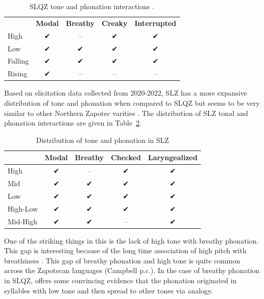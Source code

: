 \documentclass[12pt, letterpaper]{article}
\providecommand{\lsptoprule}{\midrule\toprule}
\providecommand{\lspbottomrule}{\bottomrule\midrule}
\begin{document}
\begin{table}[!ht]
	\centering
	\caption{SLQZ tone and phonation interactions \citep{chavez-peonInteractionMetricalStructure2010}.}
	\label{tab:SLQZ}
	 \begin{tabular}{lcccc}
	  \lsptoprule
					  &	 \textbf{Modal}  & \textbf{Breathy} & \textbf{Creaky} & \textbf{Interrupted} \\
		  High	& ✔︎ & -- & ✔︎ & ✔︎ \\
		  Low & ✔︎ & ✔︎ & ✔︎ & ✔︎ \\
		  Falling & ✔︎ & ✔︎ & ✔︎ & ✔︎ \\
		  Rising & ✔︎ & -- & -- & -- \\
	  \lspbottomrule
	 \end{tabular}
\end{table}

Based on elicitation data collected from 2020-2022, SLZ has a more expansive distribution of tone and phonation when compared to SLQZ but seems to be very similar to other Northern Zapotec varities \citep[e.g.,][]{avelinobecerraTopicsYalalagZapotec2004}. The distribution of SLZ tonal and phonation interactions are given in Table~\ref{tab:ToneVoiceQuality}. 
\begin{table}[!h]
	\caption{Distribution of tone and phonation in SLZ}
	\label{tab:ToneVoiceQuality}
	\centering

	\begin{tabular}{lcccc}
	\lsptoprule
		& \textbf{Modal} & \textbf{Breathy} & \textbf{Checked} & \textbf{Laryngealized} \\
	\hline
	High	& ✔ & -- & ✔ & ✔ \\
	Mid	& ✔ & ✔ & ✔ & ✔\\
	Low	& ✔	& ✔ & ✔ & ✔\\
	High-Low	& ✔	& ✔ & ✔ & ✔\\
	Mid-High	& ✔	& ✔ & -- & ✔ \\
	\lspbottomrule
	\end{tabular}
\end{table}

One of the striking things in this is the lack of high tone with breathy phonation. This gap is interesting because of the long time association of high pitch with breathiness \citep[a good overview–of this association and other phoantion types–is found in][]{eslingVoiceQualityLaryngeal2019}. This gap of breathy phonation and high tone is quite common across the Zapotecan languages (Campbell p.c.). In the case of breathy phonation in SLQZ, \citet{uchiharaToneRegistrogenesisQuiavini2016} offers some convincing evidence that the phonation originated in syllables with low tone and then spread to other tones via analogy. 
\end{document}
